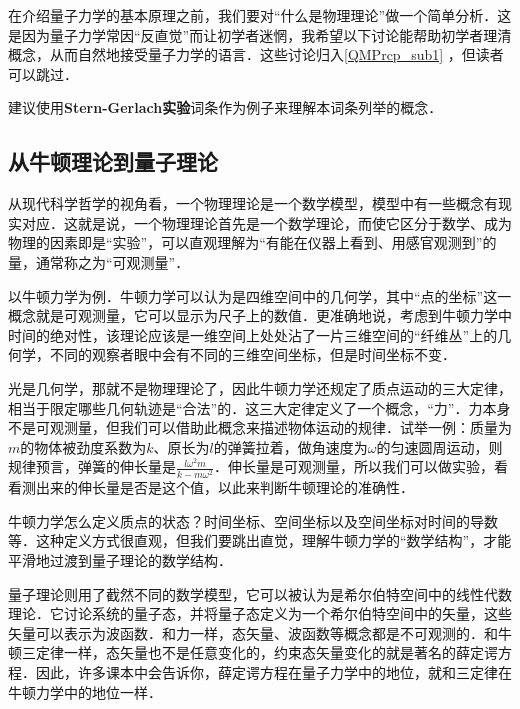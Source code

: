 


在介绍量子力学的基本原理之前，我们要对“什么是物理理论”做一个简单分析．这是因为量子力学常因“反直觉”而让初学者迷惘，我希望以下讨论能帮助初学者理清概念，从而自然地接受量子力学的语言．这些讨论归入\autoref{QMPrcp_sub1} ，但读者可以跳过．

建议使用\textbf{Stern-Gerlach实验}词条作为例子来理解本词条列举的概念．

\subsection{从牛顿理论到量子理论}\label{QMPrcp_sub1}

从现代科学哲学的视角看，一个物理理论是一个数学模型，模型中有一些概念有现实对应．这就是说，一个物理理论首先是一个数学理论，而使它区分于数学、成为物理的因素即是“实验”，可以直观理解为“有能在仪器上看到、用感官观测到”的量，通常称之为“可观测量”．

以牛顿力学为例．牛顿力学可以认为是四维空间中的几何学，其中“点的坐标”这一概念就是可观测量，它可以显示为尺子上的数值．更准确地说，考虑到牛顿力学中时间的绝对性，该理论应该是一维空间上处处沾了一片三维空间的“纤维丛”上的几何学，不同的观察者眼中会有不同的三维空间坐标，但是时间坐标不变．

光是几何学，那就不是物理理论了，因此牛顿力学还规定了质点运动的三大定律，相当于限定哪些几何轨迹是“合法”的．这三大定律定义了一个概念，“力”．力本身不是可观测量，但我们可以借助此概念来描述物体运动的规律．试举一例：质量为$m$的物体被劲度系数为$k$、原长为$l$的弹簧拉着，做角速度为$\omega$的匀速圆周运动，则规律预言，弹簧的伸长量是$\frac{l\omega^2m}{k-m\omega^2}$．伸长量是可观测量，所以我们可以做实验，看看测出来的伸长量是否是这个值，以此来判断牛顿理论的准确性．

牛顿力学怎么定义质点的状态？时间坐标、空间坐标以及空间坐标对时间的导数等．这种定义方式很直观，但我们要跳出直觉，理解牛顿力学的“数学结构”，才能平滑地过渡到量子理论的数学结构．

量子理论则用了截然不同的数学模型，它可以被认为是希尔伯特空间中的线性代数理论．它讨论系统的量子态，并将量子态定义为一个希尔伯特空间中的矢量，这些矢量可以表示为波函数．和力一样，态矢量、波函数等概念都是不可观测的．和牛顿三定律一样，态矢量也不是任意变化的，约束态矢量变化的就是著名的薛定谔方程．因此，许多课本中会告诉你，薛定谔方程在量子力学中的地位，就和三定律在牛顿力学中的地位一样．

